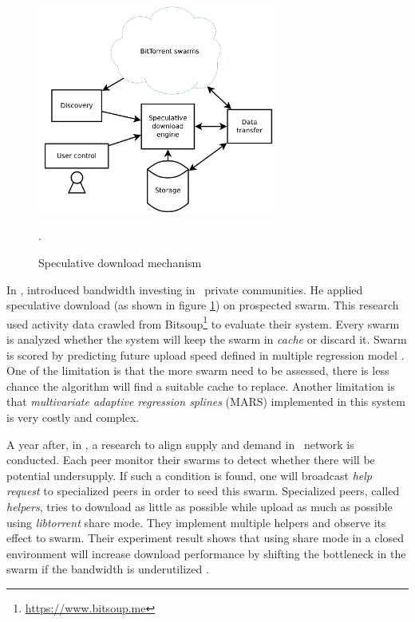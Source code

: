 \begin{figure}[h]
	\centering
	\includegraphics[width=0.7\textwidth]{pics/SDE2013.png}
	\caption{Speculative download mechanism \cite{2013:investmentcm:capota}}.
	\label{fig:sde13}
\end{figure}

In \citeyear{2013:investmentcm:capota}, \citeauthor{2013:investmentcm:capota} introduced bandwidth investing in \bt~private communities. He applied speculative download (as shown in figure \ref{fig:sde13}) on prospected swarm. This research used activity data crawled from Bitsoup\footnote{\url{https://www.bitsoup.me}} to evaluate their system. Every swarm is analyzed whether the system will keep the swarm in \textit{cache} or discard it. Swarm is scored by predicting future upload speed defined in multiple regression model \cite{2013:investmentcm:capota}. One of the limitation is that the more swarm need to be assessed, there is less chance the algorithm will find a suitable cache to replace. Another limitation is that \textit{multivariate adaptive regression splines} (MARS) implemented in this system is very costly and complex.

A year after, in \citeyear{2014:bwmarket:capota}, a research to align supply and demand in \bt~network is conducted. Each peer monitor their swarms to detect whether there will be potential undersupply. If such a condition is found, one will broadcast \textit{help request} to specialized peers in order to seed this swarm. Specialized peers, called \textit{helpers}, tries to download as little as possible while upload as much as possible using \textit{libtorrent} share mode. They implement multiple helpers and observe its effect to swarm. Their experiment result shows that using share mode in a closed environment will increase download performance  by shifting the bottleneck in the swarm if the bandwidth is underutilized \cite{2014:bwmarket:capota}. 

